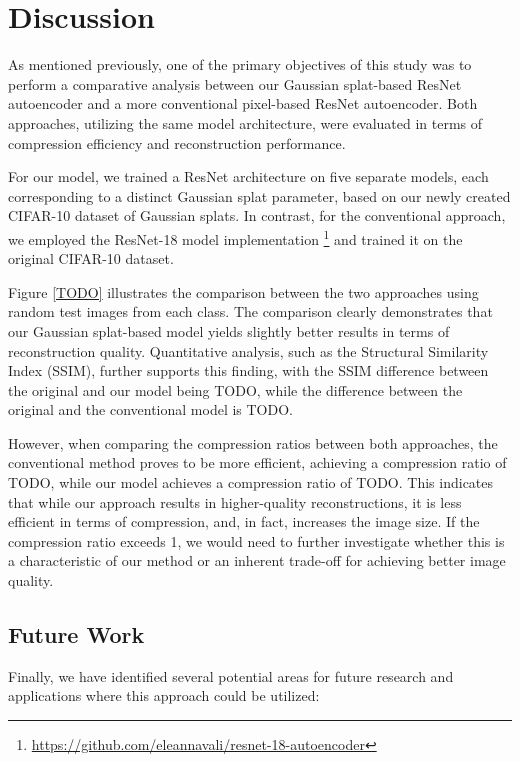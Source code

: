 \section{Discussion}
\label{sec:discussion}

As mentioned previously, one of the primary objectives of this study was to perform a comparative analysis between our Gaussian splat-based ResNet autoencoder and a more conventional pixel-based ResNet autoencoder. Both approaches, utilizing the same model architecture, were evaluated in terms of compression efficiency and reconstruction performance.

For our model, we trained a ResNet architecture on five separate models, each corresponding to a distinct Gaussian splat parameter, based on our newly created CIFAR-10 dataset of Gaussian splats. In contrast, for the conventional approach, we employed the ResNet-18 model implementation \footnote{\url{https://github.com/eleannavali/resnet-18-autoencoder}} and trained it on the original CIFAR-10 dataset.

Figure \ref{TODO} illustrates the comparison between the two approaches using random test images from each class. The comparison clearly demonstrates that our Gaussian splat-based model yields slightly better results in terms of reconstruction quality. Quantitative analysis, such as the Structural Similarity Index (SSIM), further supports this finding, with the SSIM difference between the original and our model being TODO, while the difference between the original and the conventional model is TODO.


However, when comparing the compression ratios between both approaches, the conventional method proves to be more efficient, achieving a compression ratio of TODO, while our model achieves a compression ratio of TODO. This indicates that while our approach results in higher-quality reconstructions, it is less efficient in terms of compression, and, in fact, increases the image size. If the compression ratio exceeds 1, we would need to further investigate whether this is a characteristic of our method or an inherent trade-off for achieving better image quality.

\subsection{Future Work}

Finally, we have identified several potential areas for future research and applications where this approach could be utilized:

